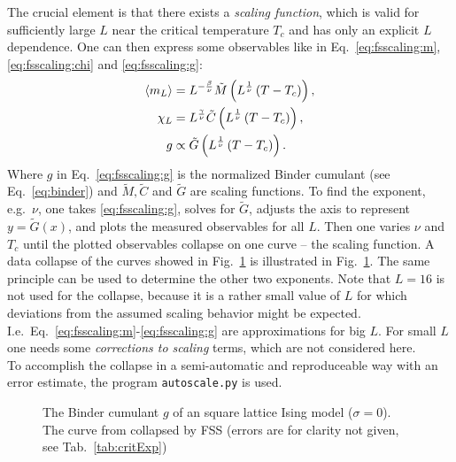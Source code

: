     The crucial element is that there exists a \emph{scaling function},
    which is valid for sufficiently large \(L\) near the critical
    temperature \(T_{c}\) and has only an explicit \(L\) dependence.
    One can then express some observables like in Eq.\ \eqref{eq:fsscaling:m}, \eqref{eq:fsscaling:chi} and
    \eqref{eq:fsscaling:g}:
    \begin{align}
        \label{eq:fsscaling:m}
        \left< m_L \right> &= L^{-\frac{\beta}{\nu}} \tilde{M}\left(L^\frac{1}{\nu}\left(T-T_c\right)\right),\\
        \label{eq:fsscaling:chi}
        \chi_L    &= L^{\frac{\gamma}{\nu}} \tilde{C}\left(L^\frac{1}{\nu}\left(T-T_c\right)\right),\\
        \label{eq:fsscaling:g}
        g         &\propto \tilde{G}\left(L^\frac{1}{\nu}\left(T-T_c\right)\right).
    \end{align}
    Where \(g\) in Eq.\ \eqref{eq:fsscaling:g} is the normalized
    Binder cumulant (see Eq.\ \eqref{eq:binder}) and \(\tilde{M}, \tilde{C}\) and \(\tilde{G}\)
    are scaling functions.
    To find the exponent, e.g.\ \(\nu\), one takes \eqref{eq:fsscaling:g},
    solves for \(\tilde{G}\), adjusts the axis to represent \(y=\tilde{G}(x)\),
    and plots the measured observables for all \(L\).
    Then one varies \(\nu\) and \(T_{c}\) until the plotted observables
    collapse on one curve -- the scaling function.
    A data collapse of the curves showed in Fig.\ \ref{fig:gettingCrit}
    is illustrated in Fig.\ \ref{fig:gettingCrit}.
    The same principle can be used to determine the other two exponents.
    Note that \(L=16\) is not used for the collapse, because it is a
    rather small value of \(L\) for which deviations from the assumed
    scaling behavior might be expected. I.e.\ Eq.\ \eqref{eq:fsscaling:m}-\eqref{eq:fsscaling:g}
    are approximations for big \(L\). For small \(L\) one needs some
    \emph{corrections to scaling} terms, which are not considered here.\\
    To accomplish the collapse in a semi-automatic and reproduceable
    way with an error estimate, the program
    \texttt{autoscale.py} \cite{autoscale2009} is used.
    \begin{figure}[htbp]
        \centering
        \caption[Examples of Determining Critical Temperature and Exponents]
        {
             The Binder cumulant \(g\)
                of an square lattice Ising model (\(\sigma=0\)).\\
             The curve from 
                collapsed by FSS (errors are for clarity
                not given, see Tab.\ \ref{tab:critExp})
        }
        \label{fig:gettingCrit}
    \end{figure}\\
